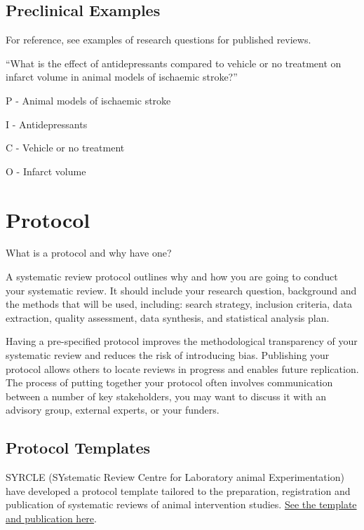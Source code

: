 \documentclass[
]{book}
\begin{document}
\hypertarget{preclinical-examples}{%
\section{Preclinical Examples}\label{preclinical-examples}}

For reference, see examples of research questions for published reviews.

``What is the effect of antidepressants compared to vehicle or no treatment on infarct volume in animal models of ischaemic stroke?''

P - Animal models of ischaemic stroke

I - Antidepressants

C - Vehicle or no treatment

O - Infarct volume

\hypertarget{protocol}{%
\chapter{Protocol}\label{protocol}}

What is a protocol and why have one?

A systematic review protocol outlines why and how you are going to conduct your systematic review. It should include your research question, background and the methods that will be used, including: search strategy, inclusion criteria, data extraction, quality assessment, data synthesis, and statistical analysis plan.

Having a pre-specified protocol improves the methodological transparency of your systematic review and reduces the risk of introducing bias. Publishing your protocol allows others to locate reviews in progress and enables future replication. The process of putting together your protocol often involves communication between a number of key stakeholders, you may want to discuss it with an advisory group, external experts, or your funders.

\hypertarget{protocol-templates}{%
\section{Protocol Templates}\label{protocol-templates}}

SYRCLE (SYstematic Review Centre for Laboratory animal Experimentation) have developed a protocol template tailored to the preparation, registration and publication of systematic reviews of animal intervention studies. \href{https://onlinelibrary.wiley.com/doi/epdf/10.1002/ebm2.7}{See the template and publication here}.
\end{document}

